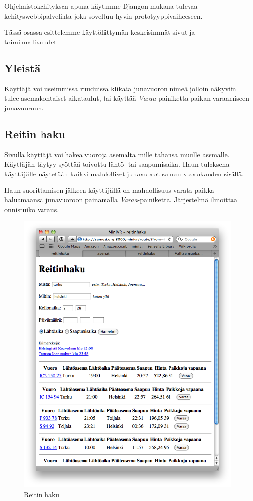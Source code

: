 \documentclass[a4paper,twoside,titlepage,12pt]{article}
\begin{document}
Ohjelmistokehityksen apuna käytimme Djangon mukana tulevaa kehityswebbipalvelinta joka soveltuu hyvin prototyyppivaiheeseen.

Tässä osassa esittelemme käyttöliittymän keskeisimmät sivut ja toiminnallisuudet.

\subsection{Yleistä}
Käyttäjä voi useimmissa ruuduissa klikata junavuoron nimeä jolloin näkyviin tulee asemakohtaiset aikataulut, tai käyttää \emph{Varaa}-painiketta paikan varaamiseen junavuoroon.

\subsection{Reitin haku}
Sivulla käyttäjä voi hakea vuoroja asemalta mille tahansa muulle asemalle. Käyttäjän täytyy syöttää toivottu lähtö- tai saapumisaika. Haun tuloksena käyttäjälle näytetään kaikki mahdolliset junavuorot saman vuorokauden sisällä.

Haun suorittamisen jälkeen käyttäjällä on mahdollisuus varata paikka haluamaansa junavuoroon painamalla \emph{Varaa}-painiketta. Järjestelmä ilmoittaa onnistuiko varaus.

\begin{figure}
  \includegraphics[width=130mm]{route.png}
  \caption{Reitin haku}
\end{figure}
\end{document}
